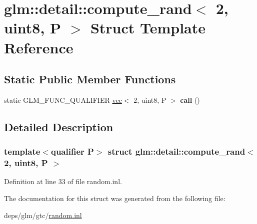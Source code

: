 \hypertarget{structglm_1_1detail_1_1compute__rand_3_012_00_01uint8_00_01P_01_4}{}\section{glm\+:\+:detail\+:\+:compute\+\_\+rand$<$ 2, uint8, P $>$ Struct Template Reference}
\label{structglm_1_1detail_1_1compute__rand_3_012_00_01uint8_00_01P_01_4}
\subsection*{Static Public Member Functions}
\begin{DoxyCompactItemize}
\item 
\mbox{\label{structglm_1_1detail_1_1compute__rand_3_012_00_01uint8_00_01P_01_4_a4fb277fdbfbcf3fa064f1694a9a9ac1a}} 
static G\+L\+M\+\_\+\+F\+U\+N\+C\+\_\+\+Q\+U\+A\+L\+I\+F\+I\+ER \hyperlink{structglm_1_1vec}{vec}$<$ 2, uint8, P $>$ {\bfseries call} ()
\end{DoxyCompactItemize}


\subsection{Detailed Description}
\subsubsection*{template$<$qualifier P$>$\newline
struct glm\+::detail\+::compute\+\_\+rand$<$ 2, uint8, P $>$}



Definition at line 33 of file random.\+inl.



The documentation for this struct was generated from the following file\+:\begin{DoxyCompactItemize}
\item 
deps/glm/gtc/\hyperlink{random_8inl}{random.\+inl}\end{DoxyCompactItemize}
